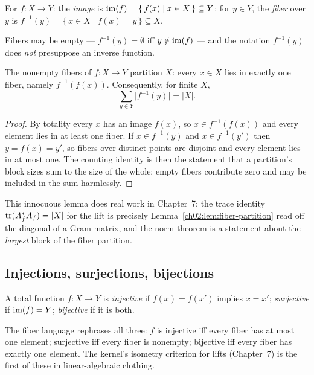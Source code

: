 \begin{definition}\label{ch02:def:image-fiber}
For $f : X \to Y$: the \emph{image} is
$\mathrm{im}(f) = \{\, f(x) \mid x \in X \,\} \subseteq Y$; for $y \in Y$, the
\emph{fiber} over $y$ is $f^{-1}(y) = \{\, x \in X \mid f(x) = y \,\}
\subseteq X$.
\end{definition}

Fibers may be empty --- $f^{-1}(y) = \emptyset$ iff $y \notin \mathrm{im}(f)$ ---
and the notation $f^{-1}(y)$ does \emph{not} presuppose an inverse function.

\begin{lemma}\label{ch02:lem:fiber-partition}
The nonempty fibers of $f : X \to Y$ partition $X$: every $x \in X$ lies in
exactly one fiber, namely $f^{-1}(f(x))$. Consequently, for finite $X$,
\[
\sum_{y \in Y} \bigl| f^{-1}(y) \bigr| = |X|.
\]
\end{lemma}

\begin{proof}
By totality every $x$ has an image $f(x)$, so $x \in f^{-1}(f(x))$ and every
element lies in at least one fiber. If $x \in f^{-1}(y)$ and
$x \in f^{-1}(y')$ then $y = f(x) = y'$, so fibers over distinct points are
disjoint and every element lies in at most one. The counting identity is
then the statement that a partition's block sizes sum to the size of the
whole; empty fibers contribute zero and may be included in the sum harmlessly.
\end{proof}

This innocuous lemma does real work in Chapter~7: the trace identity
$\mathrm{tr}(A_f^{*} A_f) = |X|$ for the lift is precisely
Lemma~\ref{ch02:lem:fiber-partition} read off the diagonal of a Gram matrix,
and the norm theorem is a statement about the \emph{largest} block of the
fiber partition.

\subsection{Injections, surjections, bijections}

\begin{definition}\label{ch02:def:inj-surj}
A total function $f : X \to Y$ is \emph{injective} if $f(x) = f(x')$
implies $x = x'$; \emph{surjective} if $\mathrm{im}(f) = Y$; \emph{bijective} if it
is both.
\end{definition}

The fiber language rephrases all three: $f$ is injective iff every fiber
has at most one element; surjective iff every fiber is nonempty; bijective
iff every fiber has exactly one element. The kernel's isometry criterion
for lifts (Chapter~7) is the first of these in linear-algebraic clothing.

